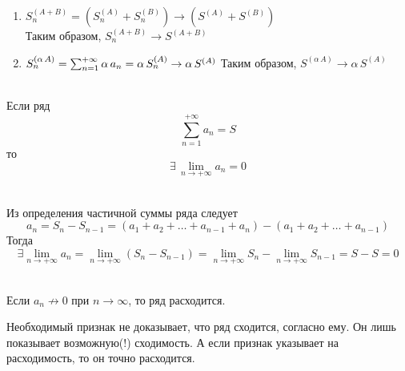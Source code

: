 \begin{Proof}
    \begin{enumerate}
        \item $S^{(A+B)}_n = (S^{(A)}_n + S^{(B)}_n) \rightarrow (S^{(A)} + S^{(B)})$\\
        Таким образом, $S^{(A+B)}_n \rightarrow S^{(A+B)}$
        
        \item $S^{(\alpha\,A)}_n = \sum^{+\infty}_{n=1}\alpha\,a_n = \alpha\,S^{(A)}_n \rightarrow \alpha\,S^{(A)}\\$
        Таким образом, $S^{(\alpha\,A)} \rightarrow \alpha\,S^{(A)}$
    \end{enumerate}
\end{Proof}

\begin{Th}~\\
	Если ряд 
    \[
        \sum^{+\infty}_{n=1}a_n = S
    \]
    то 
    \[
        \exists\, \lim_{n \rightarrow +\infty}a_n = 0
    \]
\end{Th}

\begin{Proof}~\\
    Из определения частичной суммы ряда следует
	\[
        a_n = S_n - S_{n - 1} = (a_1 + a_2 + \dots + a_{n-1} + a_n) - (a_1 + a_2 + \dots + a_{n-1})
    \]
    Тогда 
    \[
        \exists \lim_{n \rightarrow +\infty}a_n = \lim_{n \rightarrow +\infty}(S_n - S_{n-1}) = \lim_{n \rightarrow +\infty}S_n - \lim_{n \rightarrow +\infty}S_{n - 1} = S - S = 0
    \]
\end{Proof}

\begin{Note}~\\
	Если $a_n \nrightarrow 0$ при $n \rightarrow \infty$, то ряд расходится.
\end{Note}

Необходимый признак не доказывает, что ряд сходится, согласно ему. Он лишь показывает возможную(!) сходимость. А если признак указывает на расходимость, то он точно расходится.

